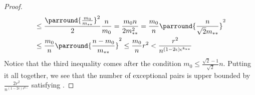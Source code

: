 \begin{lemma}[Claim 4.14]
\begin{proof}
\[\begin{split}
                        & \leq \frac{\parround{\frac{m_0}{m_{**}}}^2}{2} \frac{n}{m_0}
                            = \frac{m_0 n}{2 m_{**}^2}
                            = \frac{m_0}{n} \parround{\frac{n}{\sqrt{2}m_{**}}}^2 \\
                        & \leq \frac{m_0}{n} \parround{\frac{n - m_0}{m_{**}}}^2
                            \leq \frac{m_0}{n} r^2
                            < \frac{r^2}{n^{(1-2\epsilon) \epsilon^{k_{**}}}}
                \end{split}
            \]
            Notice that the third inequality comes after the condition $m_0 \leq \frac{\sqrt{2}-1}{\sqrt{2}} n$.
            Putting it all together, we see that the number of exceptional pairs is upper bounded by
                $\frac{2r^2}{n^{(1-2\epsilon)\epsilon^{k_{**}}}}$ satisfying .
        \end{proof}
    \end{lemma}


